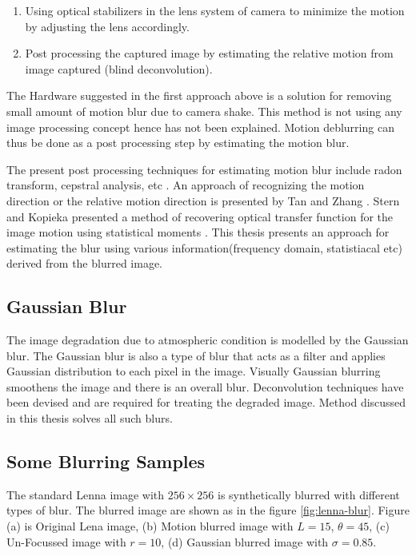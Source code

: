 \documentclass{article}
\begin{document}
\begin{enumerate}
    \begin{enumerate}
        \item Using optical stabilizers in the lens system of camera to minimize the motion by adjusting the lens accordingly.
        \item Post processing the captured image by estimating the relative motion from image captured (blind deconvolution). 
    \end{enumerate}
    
    The Hardware suggested in the first approach above is a solution for removing small amount of motion blur due to camera shake. This method is not using any image processing concept hence has not been explained. Motion deblurring can thus be done as a post processing step by estimating the motion blur. 
\end{enumerate}

The present post processing techniques for estimating motion blur include radon transform, cepstral analysis, etc \cite{6}. An approach of recognizing the motion direction or the relative motion direction is presented by Tan and Zhang \cite{7}.  Stern and Kopieka presented a method of recovering optical transfer function for the image motion using statistical moments \cite{8}. This thesis presents an approach for estimating the blur using various information(frequency domain, statistiacal etc) derived from the blurred image.

\subsection{Gaussian Blur}
The image degradation due to atmospheric condition is modelled by the Gaussian blur. The Gaussian blur is also a type of blur that acts as a filter and applies Gaussian distribution to each pixel in the image. Visually Gaussian blurring smoothens the image and there is an overall blur. Deconvolution techniques have been devised and are required for treating the degraded image. Method discussed in this thesis solves all such blurs. 

\subsection{Some Blurring Samples}
The standard Lenna image with $256 \times 256$ is synthetically blurred with different types of blur. The  blurred image are shown as in the figure \ref{fig:lenna-blur}. Figure (a) is Original Lena image, (b) Motion blurred image with $L = 15$, $\theta = 45$, (c) Un-Focussed image with $r = 10$, (d) Gaussian blurred image with $\sigma = 0.85$.
\end{document}
